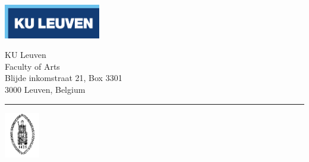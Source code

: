 \documentclass[12pt, a4paper]{report} %
\begin{document}

\begin{titlepage}
        \begin{minipage}[c]{0.5\textwidth}
            \begin{flushleft}
                \includegraphics[height=1.5cm]{KU-logo1}
            \end{flushleft}
        \end{minipage}
        \begin{minipage}[c]{0.4\textwidth}
            \begin{flushright}
                \scriptsize
                KU Leuven \\
                Faculty of Arts \\
                Blijde inkomstraat 21, Box 3301 \\
                3000 Leuven, Belgium
            \end{flushright}
        \end{minipage}
        \begin{minipage}[c]{0.03\textwidth}
                \begin{flushright}
                {\textcolor{KU-blue}{\rule{0.15cm}{1.5cm}}}
                \end{flushright}
        \end{minipage}
        \begin{minipage}[c]{0.05\textwidth}
            \begin{flushright}
                \includegraphics[height=2cm]{KU-logo2}
             \end{flushright}
        \end{minipage}


\end{titlepage}
\end{document}
